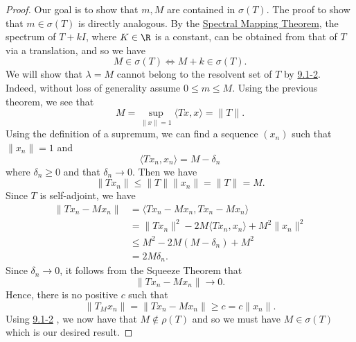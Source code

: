 \begin{proof}
Our goal is to show that \( m,M  \) are contained in \( \sigma(T) \). The proof to show that \( m \in \sigma(T) \) is directly analogous. By the {\hyperref[Spectral Mapping Theorem]{Spectral Mapping Theorem}}, the spectrum of \( T + kI \), where \( K \in \R  \) is a constant, can be obtained from that of \( T  \) via a translation, and so we have 
\[  M \in \sigma(T) \iff M + k \in \sigma(T).  \]
We will show that \( \lambda = M  \) cannot belong to the resolvent set of \( T  \) by {\hyperref[9.1-2]{9.1-2}}. Indeed, without loss of generality assume \( 0 \leq m \leq M  \). Using the previous theorem, we see that 
\[  M = \sup_{\|x\| = 1} \langle Tx , x \rangle = \|T\|. \]
Using the definition of a supremum, we can find a sequence \( ({x}_{n})  \) such that \( \|{x}_{n}\| = 1  \) and 
\[  \langle T {x}_{n} ,  {x}_{n} \rangle = M - \delta_n \]
where \( \delta_n \geq 0  \) and that \( \delta_n \to 0  \). Then we have 
\[  \|T {x}_{n}\| \leq \|T\| \|{x}_{n}\| = \|T\| = M.   \]
Since \( T  \) is self-adjoint, we have
\begin{align*}
    \|T {x}_{n} -  M {x}_{n} \| &= \langle T {x}_{n} - M {x}_{n} ,  T{x}_{n} - M {x}_{n} \rangle \\
                                &= \|T {x}_{n}\|^{2} - 2M \langle T {x}_{n} ,  {x}_{n} \rangle + M^{2} \|{x}_{n}\|^{2} \\
                                &\leq M^{2} - 2M (M - {\delta}_{n}) + M^{2} \\
                                &= 2M {\delta}_{n}.
\end{align*}
Since \( {\delta}_{n} \to 0  \), it follows from the Squeeze Theorem that 
\[  \|T {x}_{n} - M {x}_{n} \| \to 0.  \]
Hence, there is no positive \( c  \) such that 
\[  \|{T}_{M} {x}_{n} \| = \|T {x}_{n} - {Mx}_{n} \| \geq c = c \|{x}_{n}\|. \] 
Using {\hyperref[9.1-2]{9.1-2}} , we now have that \( M \notin \rho(T)  \) and so we must have \( M \in \sigma(T) \) which is our desired result.
\end{proof}

